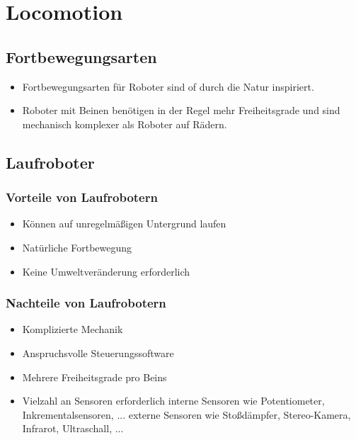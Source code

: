 \chapter{Locomotion}
\section{Fortbewegungsarten}
\begin{itemize}
	\item Fortbewegungsarten für Roboter sind of durch die Natur inspiriert.
	\item Roboter mit Beinen benötigen in der Regel mehr Freiheitsgrade und sind mechanisch komplexer als Roboter auf Rädern.
\end{itemize}
\section{Laufroboter}
\subsection{Vorteile von Laufrobotern}
\begin{itemize}
	\item Können auf unregelmäßigen Untergrund laufen
	\item Natürliche Fortbewegung
	\item Keine Umweltveränderung erforderlich
\end{itemize}
\subsection{Nachteile von Laufrobotern}
\begin{itemize}
	\item Komplizierte Mechanik
	\item Anspruchsvolle Steuerungssoftware
	\item Mehrere Freiheitsgrade pro Beins
	\item Vielzahl an Sensoren erforderlich
	\subitem interne Sensoren wie Potentiometer, Inkrementalsensoren, ...
	\subitem externe Sensoren wie Stoßdämpfer, Stereo-Kamera, Infrarot, Ultraschall, ...
\end{itemize}


